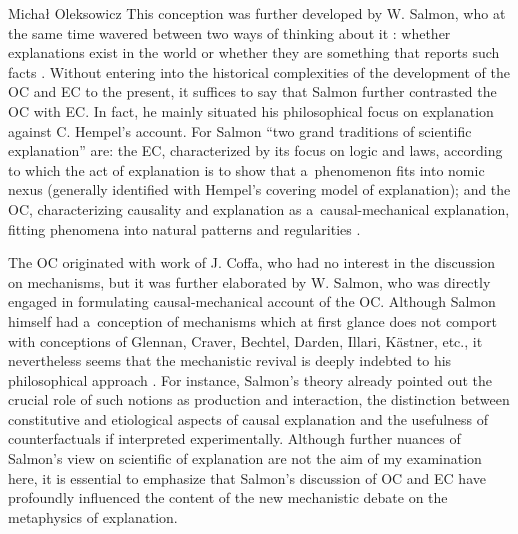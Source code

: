 \begin{artengenv}{Michał Oleksowicz}
This conception was further developed by W. Salmon, who at the same time wavered between two ways of thinking about it
\parencite[][p.262]{bokulich_fiction_2016}: %
 whether explanations exist in the world or whether they are something that reports such facts 
\parencite[][p.86]{salmon_four_1989}. %
 Without entering into the historical complexities of the development of the OC and EC to the present, it suffices to say that Salmon further contrasted the OC with EC. In fact, he mainly situated his philosophical focus on explanation against C. Hempel's account. For Salmon ``two grand traditions of scientific explanation'' 
\parencite[][pp.68–69]{salmon_four_1989} %
 are: the EC, characterized by its focus on logic and laws, according to which the act of explanation is to show that a~phenomenon fits into nomic nexus (generally identified with Hempel's covering model of explanation); and the OC, characterizing causality and explanation as a~causal-mechanical explanation, fitting phenomena into natural patterns and regularities 
\parencites[][pp.84–134]{salmon_scientific_1984}[][pp.320–330]{salmon_four_1989}.%


The OC originated with work of J. Coffa, who had no interest in the discussion on mechanisms, but it was further elaborated by W. Salmon, who was directly engaged in formulating causal-mechanical account of the OC. Although Salmon himself had a~conception of mechanisms which at first glance does not comport with conceptions of Glennan, Craver, Bechtel, Darden, Illari, Kästner, etc., it nevertheless seems that the mechanistic revival is deeply indebted to his philosophical approach
\parencite[][]{campaner_mechanistic_2013}. %
 For instance, Salmon's theory already pointed out the crucial role of such notions as production and interaction, the distinction between constitutive and etiological aspects of causal explanation and the usefulness of counterfactuals if interpreted experimentally. Although further nuances of Salmon's view on scientific of explanation are not the aim of my examination here, it is essential to emphasize that Salmon's discussion of OC and EC have profoundly influenced the content of the new mechanistic debate on the metaphysics of explanation.


\end{artengenv}
